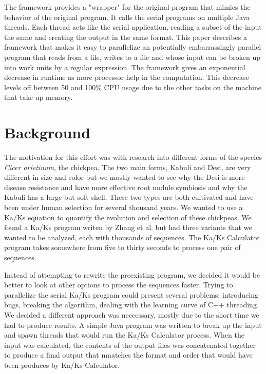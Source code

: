 \documentclass[12pt]{article}
\begin{document}
The framework provides a "wrapper" for the original program that mimics the
behavior of the original program. It calls the serial programs on multiple Java 
threads. Each thread acts like the serial application, reading a subset of the 
input the same and creating the output in the same format. This paper describes
a framework that makes it easy to parallelize an potentially embarrassingly
parallel program that reads from a file, writes to a file and whose input can be
broken up into work units by a regular expression. The framework gives an
exponential decrease in runtime as more processor help in the computation. This
decrease levels off between 50 and 100\% CPU usage due to the other tasks on the
machine that take up memory.

\section{Background}

The motivation for this effort was with research into different forms of the 
species \emph{Cicer arietinum}, the chickpea. The two main forms, Kabuli and 
Desi, are very different in size and color but we mostly wanted to see why the 
Desi is more disease resistance and have more effective root nodule symbiosis 
and why the Kabuli has a large but soft shell. These two types are both 
cultivated and have been under human selection for several thousand years. We 
wanted to use a Ka/Ks equation to quantify the evolution and selection of these 
chickpeas. We found a Ka/Ks program writen by Zhang et al. \cite{kaks} but had 
three variants that we wanted to be analyzed, each with thousands of sequences. 
The Ka/Ks Calculator program takes somewhere from five to thirty seconds to 
process one pair of sequences. 

Instead of attempting to rewrite the preexisting program, we decided it would be
better to look at other options to process the sequences faster. Trying to 
parallelize the serial Ka/Ks program could present several problems: introducing
bugs, breaking the algorithm, dealing with the learning curve of C++ threading. 
We decided a  different approach was neccessary, mostly due to the short time we
had to produce results. A simple Java program was written to break up the input 
and spawn  threads that would run the Ka/Ks Calculator process. When the input 
was calculated, the contents of the output files was concatenated together to 
produce a final output that mnatches the format and order that would have been
produces by Ka/Ks Calculator.
\end{document}
